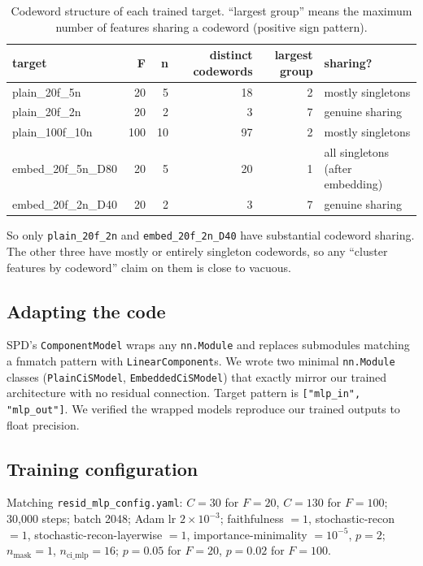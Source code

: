\documentclass[11pt]{article}
\begin{document}
\begin{table}[h]
\centering
\caption{Codeword structure of each trained target. ``largest group''
means the maximum number of features sharing a codeword (positive sign
pattern).}
\label{tab:targets}
\small
\begin{tabular}{lrrrrl}
\toprule
target & F & n & distinct codewords & largest group & sharing? \\
\midrule
plain\_20f\_5n       & 20 & 5  & 18  & 2 & mostly singletons \\
plain\_20f\_2n       & 20 & 2  & 3   & 7 & genuine sharing \\
plain\_100f\_10n     & 100 & 10 & 97 & 2 & mostly singletons \\
embed\_20f\_5n\_D80  & 20 & 5  & 20 & 1 & all singletons (after embedding) \\
embed\_20f\_2n\_D40  & 20 & 2  & 3   & 7 & genuine sharing \\
\bottomrule
\end{tabular}
\end{table}

So only \texttt{plain\_20f\_2n} and \texttt{embed\_20f\_2n\_D40} have
substantial codeword sharing. The other three have mostly or entirely
singleton codewords, so any ``cluster features by codeword'' claim on
them is close to vacuous.

\subsection{Adapting the code}

SPD's \texttt{ComponentModel} wraps any \texttt{nn.Module} and replaces
submodules matching a fnmatch pattern with \texttt{LinearComponent}s. We
wrote two minimal \texttt{nn.Module} classes (\texttt{PlainCiSModel},
\texttt{EmbeddedCiSModel}) that exactly mirror our trained architecture
with no residual connection. Target pattern is
\texttt{["mlp\_in", "mlp\_out"]}. We verified the wrapped models
reproduce our trained outputs to float precision.

\subsection{Training configuration}

Matching \texttt{resid\_mlp\_config.yaml}: $C = 30$ for $F = 20$,
$C = 130$ for $F = 100$; 30{,}000 steps; batch 2048; Adam lr
$2\times 10^{-3}$; faithfulness $= 1$, stochastic-recon $= 1$,
stochastic-recon-layerwise $= 1$, importance-minimality $= 10^{-5}$,
$p = 2$; $n_\mathrm{mask} = 1$, $n_\mathrm{ci\_mlp} = 16$;
$p = 0.05$ for $F = 20$, $p = 0.02$ for $F = 100$.
\end{document}
